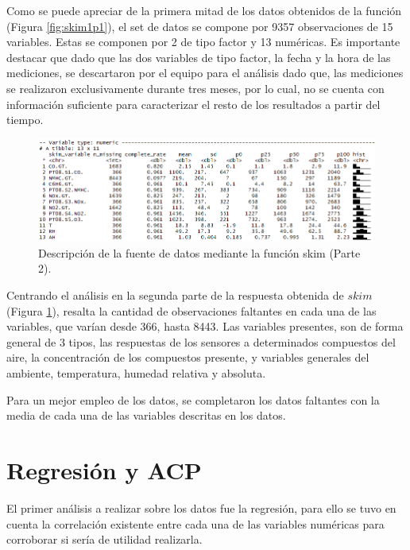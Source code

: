 \documentclass[a4paper,10pt,twocolumn]{article}
\begin{document}
  Como se puede apreciar de la primera mitad de los datos obtenidos de la función (Figura \ref{fig:skim1p1}), el set de datos se compone por 9357 observaciones de 15 variables. Estas se componen por 2 de tipo factor y 13 numéricas. Es importante destacar que dado que las dos variables de tipo factor, la fecha y la hora de las mediciones, se descartaron por el equipo para el análisis dado que, las mediciones se realizaron exclusivamente durante tres meses, por lo cual, no se cuenta con información suficiente para caracterizar el resto de los resultados a partir del tiempo. 
  
  \begin{figure}[htb]%
  	\begin{center}
  		\includegraphics[width=\linewidth]{Images/skim1p2.png}
  	\end{center}
   	\caption{Descripción de la fuente de datos mediante la función skim (Parte 2).}
  	\label{fig:skim1p2}
  \end{figure}

  Centrando el análisis en la segunda parte de la respuesta obtenida de $skim$ (Figura \ref{fig:skim1p2}), resalta la cantidad de observaciones faltantes en cada una de las variables, que varían desde 366, hasta 8443. Las variables presentes, son de forma general de 3 tipos, las respuestas de los sensores a determinados compuestos del aire, la concentración de los compuestos presente, y variables generales del ambiente, temperatura, humedad relativa y absoluta.
  
  Para un mejor empleo de los datos, se completaron los datos faltantes con la media de cada una de las variables descritas en los datos.

\section{Regresión y ACP}

  El primer análisis a realizar sobre los datos fue la regresión, para ello se tuvo en cuenta la correlación existente entre cada una de las variables numéricas para corroborar si sería de utilidad realizarla.
  
\end{document}
